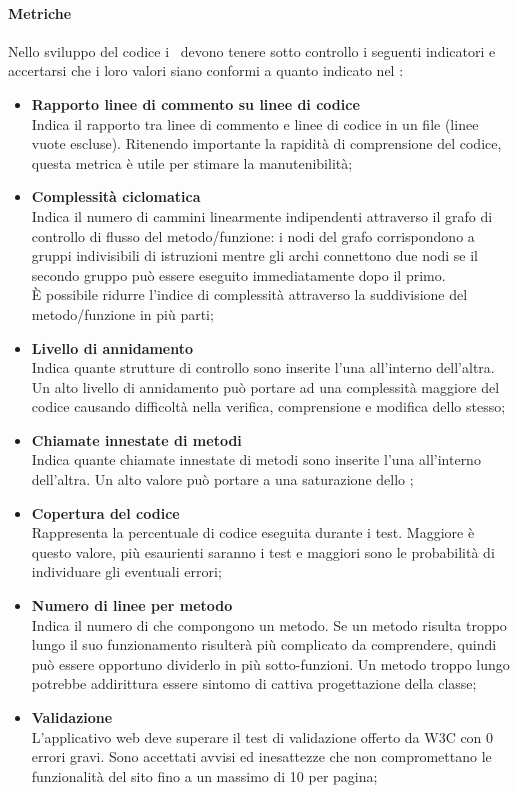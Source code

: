 \documentclass[../NormeDiProgetto.tex]{subfiles}
\begin{document}
			\paragraph{Metriche\\}
				Nello sviluppo del codice i \programmatori\ devono tenere sotto controllo i seguenti indicatori e accertarsi che i loro valori siano conformi a quanto indicato nel \pianodiqualificav:
				\begin{itemize}
					\item \textbf{Rapporto linee di commento su linee di codice\\}
						Indica il rapporto tra linee di commento e linee di codice in un
						file (linee vuote escluse). Ritenendo importante la rapidità di
						comprensione del codice, questa metrica è utile per stimare la
						manutenibilità;
					\item \textbf{Complessità ciclomatica\\}
						Indica il numero di cammini linearmente indipendenti attraverso il
						grafo di controllo di flusso del metodo/funzione: i nodi del grafo
						corrispondono a gruppi indivisibili di istruzioni mentre gli archi
						connettono due nodi se il secondo gruppo può essere eseguito
						immediatamente dopo il primo.\\
						È possibile ridurre l'indice di complessità attraverso la
						suddivisione del metodo/funzione in più parti;
					\item \textbf{Livello di annidamento\\}
						Indica quante strutture di controllo sono inserite l'una all'interno
						dell'altra. Un alto livello di annidamento può portare ad una
						complessità maggiore del codice causando difficoltà nella verifica,
						comprensione e modifica dello stesso;
					\item \textbf{Chiamate innestate di metodi\\}
						Indica quante chiamate innestate di metodi sono inserite l'una
						all'interno dell'altra. Un alto valore può portare a una saturazione
						dello ;
					\item \textbf{Copertura del codice\\}
						Rappresenta la percentuale di codice eseguita durante i test.
						Maggiore è questo valore, più esaurienti saranno i test e maggiori
						sono le probabilità di individuare gli eventuali errori;
					\item \textbf{Numero di linee per metodo\\}
						Indica il numero di  che compongono un metodo.
						Se un metodo risulta troppo lungo il suo funzionamento risulterà più
						complicato da comprendere, quindi può essere opportuno dividerlo in
						più sotto-funzioni. Un metodo troppo lungo potrebbe addirittura essere
						sintomo di cattiva progettazione della classe;
					\item \textbf{Validazione \\}
						L'applicativo web deve superare il test di validazione offerto da
						W3C con 0 errori gravi.
						Sono accettati avvisi ed inesattezze che non compromettano le
						funzionalità del sito fino a un massimo di 10 per pagina;
				\end{itemize}
\end{document}
